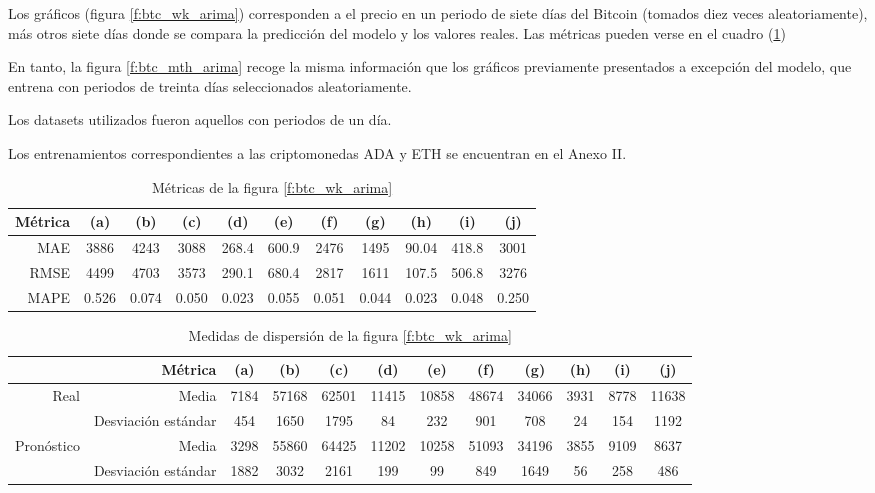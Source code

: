 \documentclass[a4paper,10pt]{article}
\begin{document}
Los gráficos (figura \ref{f:btc_wk_arima}) corresponden a el precio en un periodo de siete días del Bitcoin (tomados diez veces aleatoriamente), más otros siete días donde se compara la predicción del modelo y los valores reales. Las métricas pueden verse en el cuadro (\ref{tab:btc})

En tanto, la figura \ref{f:btc_mth_arima} recoge la misma información que los gráficos previamente presentados a excepción del modelo, que entrena con periodos de treinta días seleccionados aleatoriamente.

Los datasets utilizados fueron aquellos con periodos de un día.

Los entrenamientos correspondientes a las criptomonedas ADA y ETH se encuentran en el Anexo II.


\begin{table}[H]
 \begin{center}
 \resizebox{12cm}{!} {
  \begin{tabular}{|r|c|c|c|c|c|c|c|c|c|c|}
    Métrica & (a) & (b) & (c) & (d) & (e) & (f) & (g) & (h) & (i) & (j) \\ \hline
    MAE & 3886 & 4243 & 3088 & 268.4 & 600.9 & 2476 & 1495 & 90.04 & 418.8 & 3001 \\
    RMSE & 4499 & 4703 & 3573 & 290.1 & 680.4 & 2817 & 1611 & 107.5 & 506.8 & 3276 \\
    MAPE & 0.526 & 0.074 & 0.050 & 0.023 & 0.055 & 0.051 & 0.044 & 0.023 & 0.048 & 0.250 \\ \hline
  \end{tabular}
  }
  \caption{Métricas de la figura \ref{f:btc_wk_arima}}
  \label{tab:btc}
 \end{center}
\end{table}

\begin{table}[H]
 \begin{center}
 \resizebox{12cm}{!} {
  \begin{tabular}{|r|r|c|c|c|c|c|c|c|c|c|c|}
    & Métrica & (a) & (b) & (c) & (d) & (e) & (f) & (g) & (h) & (i) & (j) \\ \hline
    Real & Media & 7184& 57168& 62501& 11415& 10858& 48674& 34066& 3931& 8778& 11638 \\
    & Desviación estándar & 454& 1650& 1795& 84& 232& 901& 708& 24& 154& 1192 \\
    Pronóstico & Media & 3298& 55860& 64425& 11202& 10258& 51093& 34196& 3855& 9109& 8637 \\
    & Desviación estándar & 1882& 3032& 2161& 199& 99& 849& 1649& 56& 258& 486 \\ \hline
  \end{tabular}
  }
  \caption{Medidas de dispersión de la figura \ref{f:btc_wk_arima}}
  \label{tab:btc_wk_avestd}
 \end{center}
\end{table}
\end{document}
